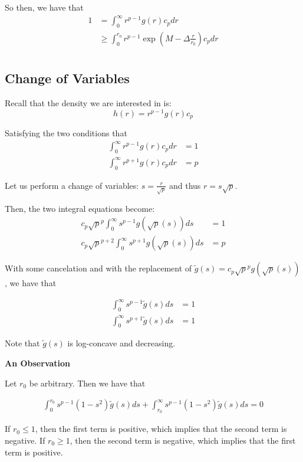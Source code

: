 \documentclass{article}
\begin{document}
So then, we have that
\begin{align*}
1 &= \int_0^\infty r^{p-1} g(r) c_p dr \\
 &\geq  \int_0^{r_0} r^{p-1} \exp\left( M - \Delta \frac{r}{r_0} \right) c_p dr \\
\end{align*}
\subsection{Change of Variables}

Recall that the density we are interested in is:
\[
h(r) = r^{p-1} g(r) c_p
\]

Satisfying the two conditions that
\begin{align*}
\int_0^\infty r^{p-1} g(r) c_p dr &= 1 \\
\int_0^\infty r^{p+1} g(r) c_p dr &= p 
\end{align*}

Let us perform a change of variables: $s = \frac{r}{\sqrt{p}}$ and thus $r = s \sqrt{p}$. 

Then, the two integral equations become:
\begin{align*}
c_p \sqrt{p}^p \int_0^\infty s^{p-1} g(\sqrt{p}(s)) ds &= 1 \\
c_p \sqrt{p}^{p+2} \int_0^\infty s^{p+1} g(\sqrt{p}(s)) ds &= p 
\end{align*}

With some cancelation and with the replacement of $\tilde{g}(s) = c_p \sqrt{p}^p g(\sqrt{p}(s))$, we have that

\begin{align*}
\int_0^\infty s^{p-1} \tilde{g}(s) ds &= 1 \\
\int_0^\infty s^{p+1} \tilde{g}(s) ds &= 1
\end{align*}

Note that $\tilde{g}(s)$ is log-concave and decreasing. 

\textbf{An Observation}

Let $r_0$ be arbitrary. Then we have that

\begin{align*}
\int_0^{r_0} s^{p-1} (1 - s^2) \tilde{g}(s) ds + \int_{r_0}^\infty s^{p-1} (1 - s^2) \tilde{g}(s) ds = 0
\end{align*}

If $r_0 \leq 1$, then the first term is positive, which implies that the second term is negative.
If $r_0 \geq 1$, then the second term is negative, which implies that the first term is positive.
\end{document}
